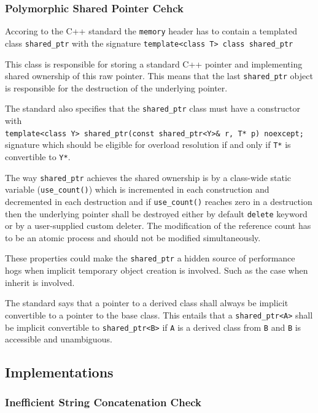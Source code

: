 \subsubsection{Polymorphic Shared Pointer Cehck}
\par Accoring to the C++ standard the \verb|memory| header has to contain a templated class \verb|shared_ptr| with the signature \verb|template<class T> class shared_ptr|\cite[\S20.8.2.2]{cpp_standard} \medskip
\par This class is responsible for storing a standard C++ pointer and implementing shared ownership of this raw pointer. This means that the last \verb|shared_ptr| object is responsible for the destruction of the underlying pointer. \medskip
\par The standard also specifies that the \verb|shared_ptr| class must have a constructor with \\
\verb|template<class Y> shared_ptr(const shared_ptr<Y>& r, T* p) noexcept;|\\ \cite[\S20.8.2.2.1]{cpp_standard}
signature which should be eligible for overload resolution if and only  if \verb|T*| is convertible to \verb|Y*|. \medskip
\par The way \verb|shared_ptr| achieves the shared ownership is by a class-wide static variable (\verb|use_count()|) which is incremented in each construction and decremented in each destruction and if \verb|use_count()|  reaches zero in a destruction then the underlying pointer shall be destroyed either by default \verb|delete| keyword or by a user-supplied custom deleter. The modification of the reference count has to be an atomic process and should not be modified simultaneously\cite[\S20.8.2.2 4.]{cpp_standard}. \medskip
\par These properties could make the \verb|shared_ptr| a hidden source of performance hogs when implicit temporary object creation is involved.  Such as the case when inherit is involved. \medskip
\par The standard says that a pointer to a derived class shall always be implicit convertible to a pointer to the base class\cite[\S4.10 3.]{cpp_standard}. This entails that a \verb|shared_ptr<A>| shall be implicit convertible to \verb|shared_ptr<B>| if \verb|A| is a derived class from \verb|B| and \verb|B| is accessible and unambiguous.
\subsection{Implementations}
\subsubsection{Inefficient String Concatenation Check}
